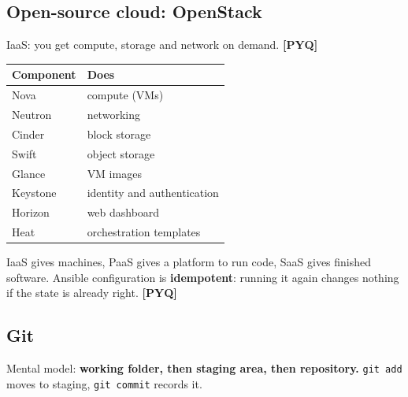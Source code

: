 \documentclass[11pt,a4paper]{article}
\newcommand{\pyq}{\textcolor{ember}{\scriptsize\textbf{[PYQ]}}}
\begin{document}
\subsection{Open-source cloud: OpenStack}
IaaS: you get compute, storage and network on demand. \pyq{}

\begin{center}\small\renewcommand{\arraystretch}{1.18}\setlength{\tabcolsep}{9pt}
\begin{tabularx}{\linewidth}{@{}l>{\raggedright\arraybackslash}X@{}}
\toprule
\textbf{\color{slate}Component} & \textbf{\color{slate}Does} \\ \midrule
Nova & compute (VMs) \\
Neutron & networking \\
Cinder & block storage \\
Swift & object storage \\
Glance & VM images \\
Keystone & identity and authentication \\
Horizon & web dashboard \\
Heat & orchestration templates \\
\bottomrule
\end{tabularx}\end{center}
IaaS gives machines, PaaS gives a platform to run code, SaaS gives finished software. Ansible configuration is \textbf{idempotent}: running it again changes nothing if the state is already right. \pyq{}

\subsection{Git}
Mental model: \textbf{working folder, then staging area, then repository.} \texttt{git add} moves to staging, \texttt{git commit} records it.
\end{document}
